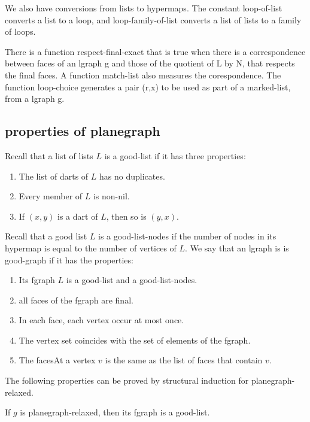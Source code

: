 \bigskip
We also have conversions from lists to hypermaps.  The constant loop-of-list converts a list to a loop,
and loop-family-of-list converts a list of lists to a family of loops.

There is a function respect-final-exact that is true when there is a correspondence between
faces of an lgraph g and those of the quotient of L by N, that respects the final faces.
A function match-list also measures the corespondence.  The function loop-choice generates a pair (r,x)
to be used as part of a marked-list, from a lgraph g.





\subsection{properties of planegraph}

\begin{definition}
Recall that a list of lists $L$ is a good-list if it has three properties:
\begin{enumerate}
\item The list of darts of $L$ has no duplicates.
\item Every member of $L$ is non-nil.
\item If $(x,y)$ is a dart of $L$, then so is $(y,x)$.
\end{enumerate}
Recall that a good list $L$ is a good-list-nodes if 
the number of nodes in its hypermap is equal to the number
of vertices of $L$.
We say that an lgraph is is good-graph if it has the properties:
\begin{enumerate}
\item Its fgraph $L$ is a good-list and a good-list-nodes.
\item all faces of the fgraph are final.
\item In each face, each vertex occur at most once.
\item The vertex set coincides with the set of elements of the fgraph.
\item The facesAt a vertex $v$ is the same as the list of faces that contain $v$.
\end{enumerate}
\end{definition}

The following properties can be proved by structural induction
for planegraph-relaxed.

\begin{lemma} 
If $g$ is planegraph-relaxed, then its fgraph is a good-list.
\end{lemma}  
 


